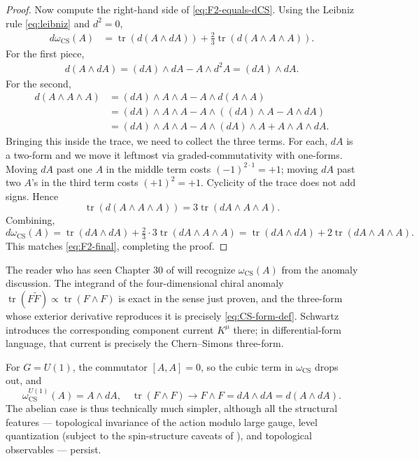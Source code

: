 \documentclass[11pt]{article}
\newcommand{\tr}{\operatorname{tr}}
\newcommand{\CS}{\operatorname{CS}}
\theoremstyle{definition}
\numberwithin{theorem}{section}
\numberwithin{equation}{section}
\begin{document}
\begin{proof}
\medskip

\noindent Now compute the right-hand side of \eqref{eq:F2-equals-dCS}. Using the Leibniz rule \eqref{eq:leibniz} and $d^2 = 0$,
\begin{align*}
d\omega_{\CS}(A) &= \tr\left(d(A\wedge dA)\right) + \tfrac{2}{3}\tr\left(d(A\wedge A\wedge A)\right).
\end{align*}
For the first piece,
\begin{align*}
d(A\wedge dA) = (dA)\wedge dA - A\wedge d^2 A = (dA)\wedge dA.
\end{align*}
For the second,
\begin{align*}
d(A\wedge A\wedge A) &= (dA)\wedge A\wedge A - A\wedge d(A\wedge A) \\
&= (dA)\wedge A\wedge A - A\wedge\left((dA)\wedge A - A\wedge dA\right) \\
&= (dA)\wedge A\wedge A - A\wedge (dA)\wedge A + A\wedge A\wedge dA.
\end{align*}
Bringing this inside the trace, we need to collect the three terms. For each, $dA$ is a two-form and we move it leftmost via graded-commutativity with one-forms. Moving $dA$ past one $A$ in the middle term costs $(-1)^{2\cdot 1} = +1$; moving $dA$ past two $A$'s in the third term costs $(+1)^2 = +1$. Cyclicity of the trace does not add signs. Hence
\begin{equation*}
\tr\left(d(A\wedge A\wedge A)\right) = 3\tr(dA\wedge A\wedge A).
\end{equation*}
Combining,
\begin{equation*}
d\omega_{\CS}(A) = \tr(dA\wedge dA) + \tfrac{2}{3}\cdot 3\tr(dA\wedge A\wedge A) = \tr(dA\wedge dA) + 2\tr(dA\wedge A\wedge A).
\end{equation*}
This matches \eqref{eq:F2-final}, completing the proof.
\end{proof}

\begin{remark}
The reader who has seen Chapter 30 of \cite{Schwartz2014QFT} will recognize $\omega_{\CS}(A)$ from the anomaly discussion. The integrand of the four-dimensional chiral anomaly $\tr(F\tilde F) \propto \tr(F\wedge F)$ is exact in the sense just proven, and the three-form whose exterior derivative reproduces it is precisely \eqref{eq:CS-form-def}. Schwartz introduces the corresponding component current $K^\mu$ there; in differential-form language, that current is precisely the Chern--Simons three-form.
\end{remark}

\begin{remark}\label{rem:abelian-CS}
For $G = U(1)$, the commutator $[A,A] = 0$, so the cubic term in $\omega_{\CS}$ drops out, and
\begin{equation*}
\omega_{\CS}^{U(1)}(A) = A\wedge dA, \quad \tr(F\wedge F) \to F\wedge F = dA\wedge dA = d(A\wedge dA).
\end{equation*}
The abelian case is thus technically much simpler, although all the structural features --- topological invariance of the action modulo large gauge, level quantization (subject to the spin-structure caveats of \cite{SeibergWitten2016Spin}), and topological observables --- persist.
\end{remark}
\end{document}
